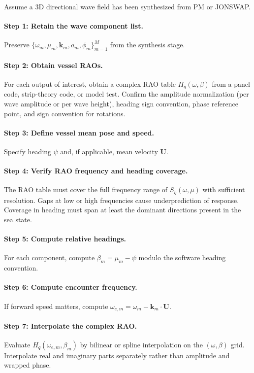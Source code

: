 \documentclass[journal,10pt,twocolumn]{IEEEtran}
\newcommand{\vect}[1]{\bm{#1}}
\begin{document}
    Assume a 3D directional wave field has been synthesized from PM or JONSWAP.

    \paragraph{Step 1: Retain the wave component list.}
    Preserve $\{\omega_m,\mu_m,\vect{k}_m,a_m,\phi_m\}_{m=1}^M$ from the synthesis stage.

    \paragraph{Step 2: Obtain vessel RAOs.}
    For each output of interest, obtain a complex RAO table $H_q(\omega,\beta)$ from a
    panel code, strip-theory code, or model test.
    Confirm the amplitude normalization (per wave amplitude or per wave height), heading
    sign convention, phase reference point, and sign convention for rotations.

    \paragraph{Step 3: Define vessel mean pose and speed.}
    Specify heading $\psi$ and, if applicable, mean velocity $\vect{U}$.

    \paragraph{Step 4: Verify RAO frequency and heading coverage.}
    The RAO table must cover the full frequency range of $S_\eta(\omega,\mu)$ with
    sufficient resolution.
    Gaps at low or high frequencies cause underprediction of response.
    Coverage in heading must span at least the dominant directions present in the sea state.

    \paragraph{Step 5: Compute relative headings.}
    For each component, compute $\beta_m=\mu_m-\psi$ modulo the software heading convention.

    \paragraph{Step 6: Compute encounter frequency.}
    If forward speed matters, compute $\omega_{e,m}=\omega_m-\vect{k}_m\cdot\vect{U}$.

    \paragraph{Step 7: Interpolate the complex RAO.}
    Evaluate $H_q(\omega_{e,m},\beta_m)$ by bilinear or spline interpolation on the
    $(\omega,\beta)$ grid.
    Interpolate real and imaginary parts separately rather than amplitude and wrapped phase.
\end{document}
